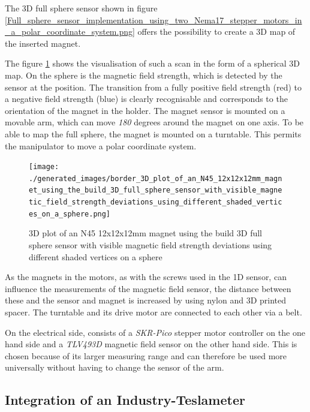 The 3D full sphere sensor shown in figure
\ref{Full_sphere_sensor_implementation_using_two_Nema17_stepper_motors_in_a_polar_coordinate_system.png}
offers the possibility to create a 3D map of the inserted magnet.

The figure
\ref{3D_plot_of_an_N45_12x12x12mm_magnet_using_the_build_3D_full_sphere_sensor_with_visible_magnetic_field_strength_deviations_using_different_shaded_vertices_on_a_sphere.png}
shows the visualisation of such a scan in the form of a spherical 3D
map. On the sphere is the magnetic field strength, which is detected by
the sensor at the position. The transition from a fully positive field
strength (red) to a negative field strength (blue) is clearly
recognisable and corresponds to the orientation of the magnet in the
holder. The magnet sensor is mounted on a movable arm, which can move
\emph{180} degrees around the magnet on one axis. To be able to map the
full sphere, the magnet is mounted on a turntable. This permits the
manipulator to move a polar coordinate system.

\begin{figure}
\centering
\texttt{[image: ./generated\_images/border\_3D\_plot\_of\_an\_N45\_12x12x12mm\_magnet\_using\_the\_build\_3D\_full\_sphere\_sensor\_with\_visible\_magnetic\_field\_strength\_deviations\_using\_different\_shaded\_vertices\_on\_a\_sphere.png]}
\caption{3D plot of an N45 12x12x12mm magnet using the build 3D full
sphere sensor with visible magnetic field strength deviations using
different shaded vertices on a sphere
\label{3D_plot_of_an_N45_12x12x12mm_magnet_using_the_build_3D_full_sphere_sensor_with_visible_magnetic_field_strength_deviations_using_different_shaded_vertices_on_a_sphere.png}}
\end{figure}

As the magnets in the motors, as with the screws used in the 1D sensor,
can influence the measurements of the magnetic field sensor, the
distance between these and the sensor and magnet is increased by using
nylon and 3D printed spacer. The turntable and its drive motor are
connected to each other via a belt.

On the electrical side, consists of a \emph{SKR-Pico} stepper motor
controller on the one hand side and a \emph{TLV493D} magnetic field
sensor on the other hand side. This is chosen because of its larger
measuring range and can therefore be used more universally without
having to change the sensor of the arm.

\hypertarget{integration-of-an-industry-teslameter}{%
\subsection{Integration of an
Industry-Teslameter}\label{integration-of-an-industry-teslameter}}

